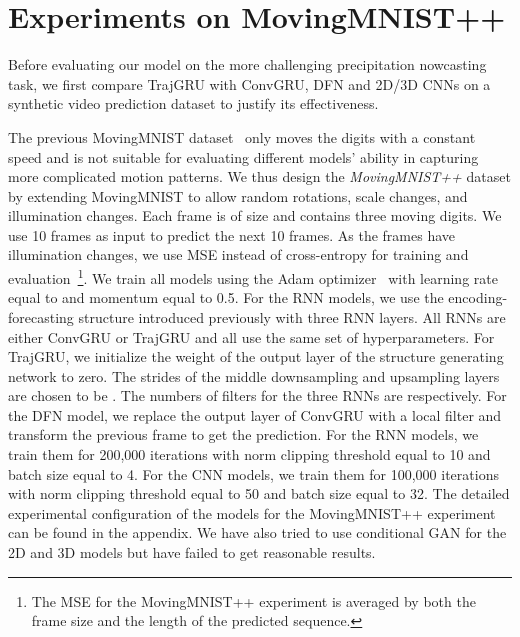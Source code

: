 \documentclass{article}
\begin{document}
\section{Experiments on MovingMNIST++}
Before evaluating our model on the more challenging precipitation nowcasting task, we first compare TrajGRU with ConvGRU, DFN and 2D/3D CNNs on a synthetic video prediction dataset to justify its effectiveness.

The previous MovingMNIST dataset~\cite{srivastava2015unsupervised,xingjian2015convolutional} only moves the digits with a constant speed and is not suitable for evaluating different models' ability in capturing more complicated motion patterns. We thus design the \emph{MovingMNIST++} dataset by extending MovingMNIST to allow random rotations, scale changes, and illumination changes. Each frame is of size  and contains three moving digits. We use 10 frames as input to predict the next 10 frames. As the frames have illumination changes, we use MSE instead of cross-entropy for training and evaluation~\footnote{The MSE for the MovingMNIST++ experiment is averaged by both the frame size and the length of the predicted sequence.}. We train all models using the Adam optimizer~\cite{kingma2014adam} with learning rate equal to  and momentum equal to 0.5. For the RNN models, we use the encoding-forecasting structure introduced previously with three RNN layers. All RNNs are either ConvGRU or TrajGRU and all use the same set of hyperparameters. For TrajGRU, we initialize the weight of the output layer of the structure generating network to zero. The strides of the middle downsampling and upsampling layers are chosen to be . The numbers of filters for the three RNNs are  respectively. For the DFN model, we replace the output layer of ConvGRU with a  local filter and transform the previous frame to get the prediction. For the RNN models, we train them for 200,000 iterations with norm clipping threshold equal to 10 and batch size equal to 4. For the CNN models, we train them for 100,000 iterations with norm clipping threshold equal to 50 and batch size equal to 32. The detailed experimental configuration of the models for the MovingMNIST++ experiment can be found in the appendix. We have also tried to use conditional GAN for the 2D and 3D models but have failed to get reasonable results.
\end{document}
